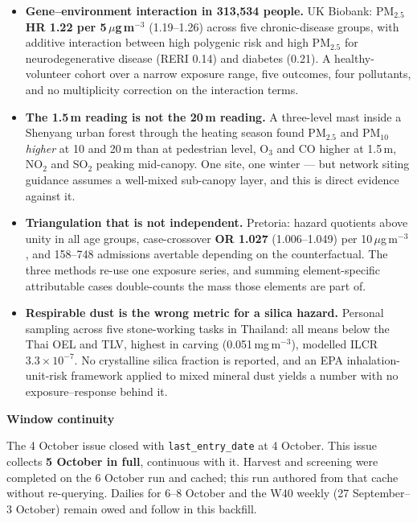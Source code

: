 \documentclass[10pt]{article}
\begin{document}
\footnotesize
\begin{itemize}

\item \textbf{Gene--environment interaction in 313,534 people.} UK Biobank: PM$_{2.5}$ \textbf{HR 1.22 per
5\,$\mu$g\,m$^{-3}$} (1.19--1.26) across five chronic-disease groups, with additive interaction between
high polygenic risk and high PM$_{2.5}$ for neurodegenerative disease (RERI 0.14) and diabetes (0.21).
A healthy-volunteer cohort over a narrow exposure range, five outcomes, four pollutants, and no
multiplicity correction on the interaction terms.

\item \textbf{The 1.5\,m reading is not the 20\,m reading.} A three-level mast inside a Shenyang urban forest
through the heating season found PM$_{2.5}$ and PM$_{10}$ \textit{higher} at 10 and 20\,m than at pedestrian
level, O$_3$ and CO higher at 1.5\,m, NO$_2$ and SO$_2$ peaking mid-canopy. One site, one winter --- but
network siting guidance assumes a well-mixed sub-canopy layer, and this is direct evidence against it.

\item \textbf{Triangulation that is not independent.} Pretoria: hazard quotients above unity in all age
groups, case-crossover \textbf{OR 1.027} (1.006--1.049) per 10\,$\mu$g\,m$^{-3}$, and 158--748 admissions
avertable depending on the counterfactual. The three methods re-use one exposure series, and summing
element-specific attributable cases double-counts the mass those elements are part of.

\item \textbf{Respirable dust is the wrong metric for a silica hazard.} Personal sampling across five
stone-working tasks in Thailand: all means below the Thai OEL and TLV, highest in carving
(0.051\,mg\,m$^{-3}$), modelled ILCR $3.3\times10^{-7}$. No crystalline silica fraction is reported, and an
EPA inhalation-unit-risk framework applied to mixed mineral dust yields a number with no
exposure--response behind it.

\end{itemize}

\vspace{2mm}

\begin{keybox}
{\sffamily\bfseries\footnotesize\color{Deep}Window continuity}\\[1.2mm]
{\fontsize{7.2}{8.8}\selectfont
The 4 October issue closed with \texttt{last\_entry\_date} at 4 October. This issue collects
\textbf{5 October in full}, continuous with it. Harvest and screening were completed on the 6 October run
and cached; this run authored from that cache without re-querying. Dailies for 6--8 October and the W40
weekly (27 September--3 October) remain owed and follow in this backfill.\par}
\end{keybox}
\end{document}
